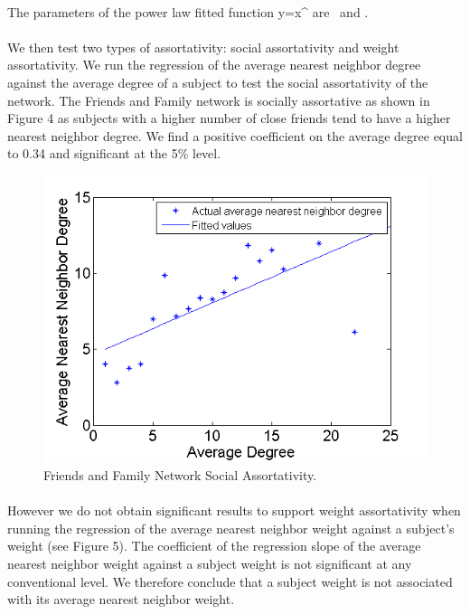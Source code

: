 \documentclass[11pt]{article}
\begin{document}
\paragraph{}
The parameters of the power law fitted function y=\alpha x^\beta \]   are  \] \ and \].

\paragraph{}
We then test two types of assortativity: social assortativity and weight assortativity. We run the regression of the average nearest neighbor degree against the average degree of a subject to test the social assortativity of the network. The Friends and Family network is socially assortative as shown in Figure 4 as subjects with a higher number of close friends tend to have a higher nearest neighbor degree. We find a positive coefficient on the average degree equal to 0.34 and significant at the 5\% level.


\begin{figure}[!h]
\center
   \includegraphics[scale=0.72]{social_assortativity_figure2.png}
   \caption{\label{2} Friends and Family Network Social Assortativity.}
\end{figure}

\paragraph{}
However we do not obtain significant results to support weight assortativity when running the regression of the average nearest neighbor weight against a subject's weight (see Figure 5). The coefficient of the regression slope of the average nearest neighbor weight against a subject weight is not significant at any conventional level. We therefore conclude that a subject weight is not associated with its average nearest neighbor weight. 
\end{document}
